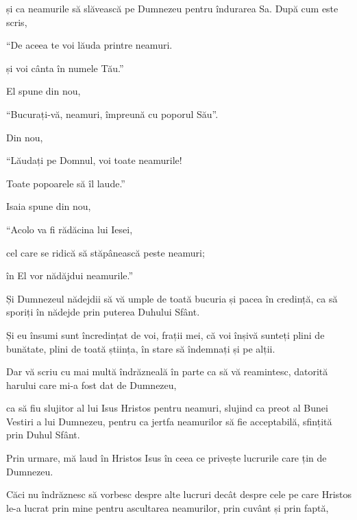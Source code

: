 {și ca neamurile să slăvească pe Dumnezeu pentru îndurarea Sa. După cum este scris,

\par }{\Q “De aceea te voi lăuda printre neamuri.

\par }{\QB și voi cânta în numele Tău.”


\par }{\PP {}El spune din nou,

\par }{\Q “Bucurați-vă, neamuri, împreună cu poporul Său”.


\par }{\PP {}Din nou,

\par }{\Q “Lăudați pe Domnul, voi toate neamurile!

\par }{\QB Toate popoarele să îl laude.”


\par }{\PP {}Isaia spune din nou,

\par }{\Q “Acolo va fi rădăcina lui Iesei,

\par }{\QB cel care se ridică să stăpânească peste neamuri;

\par }{\QB în El vor nădăjdui neamurile.”


\par }{\PP {}Și Dumnezeul nădejdii să vă umple de toată bucuria și pacea în credință, ca să sporiți în nădejde prin puterea Duhului Sfânt.


\par }{\PP {}Și eu însumi sunt încredințat de voi, frații mei, că voi înșivă sunteți plini de bunătate, plini de toată știința, în stare să îndemnați și pe alții.

Dar vă scriu cu mai multă îndrăzneală în parte ca să vă reamintesc, datorită harului care mi-a fost dat de Dumnezeu,

ca să fiu slujitor al lui Isus Hristos pentru neamuri, slujind ca preot al Bunei Vestiri a lui Dumnezeu, pentru ca jertfa neamurilor să fie acceptabilă, sfințită prin Duhul Sfânt.

Prin urmare, mă laud în Hristos Isus în ceea ce privește lucrurile care țin de Dumnezeu.

Căci nu îndrăznesc să vorbesc despre alte lucruri decât despre cele pe care Hristos le-a lucrat prin mine pentru ascultarea neamurilor, prin cuvânt și prin faptă,

}
